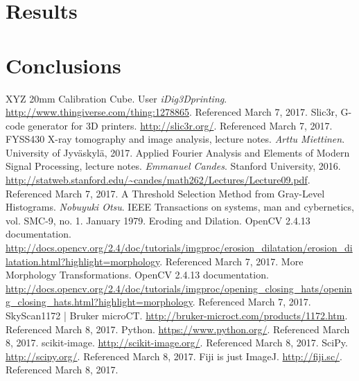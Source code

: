 \documentclass[a4paper,twoside,12pt]{article}
\begin{document}
\section{Results}

\section{Conclusions}

\clearpage

\begin{thebibliography}{9}
     XYZ 20mm Calibration Cube. User \emph{iDig3Dprinting}. \url{http://www.thingiverse.com/thing:1278865}. Referenced March 7, 2017.
     Slic3r, G-code generator for 3D printers. \url{http://slic3r.org/}. Referenced March 7, 2017.
     FYSS430 X-ray tomography and image analysis, lecture notes. \emph{Arttu Miettinen}. University of Jyväskylä, 2017.
     Applied Fourier Analysis and Elements of Modern Signal Processing, lecture notes. \emph{Emmanuel Candes}. Stanford University, 2016. \url{http://statweb.stanford.edu/~candes/math262/Lectures/Lecture09.pdf}. Referenced March 7, 2017.
     A Threshold Selection Method from Gray-Level Histograms. \emph{Nobuyuki Otsu}. IEEE Transactions on systems, man and cybernetics, vol. SMC-9, no. 1. January 1979.
     Eroding and Dilation. OpenCV 2.4.13 documentation. \url{http://docs.opencv.org/2.4/doc/tutorials/imgproc/erosion_dilatation/erosion_dilatation.html?highlight=morphology}. Referenced March 7, 2017.
     More Morphology Transformations. OpenCV 2.4.13 documentation. \url{http://docs.opencv.org/2.4/doc/tutorials/imgproc/opening_closing_hats/opening_closing_hats.html?highlight=morphology}. Referenced March 7, 2017.
     SkyScan1172 | Bruker microCT. \url{http://bruker-microct.com/products/1172.htm}. Referenced March 8, 2017.
     Python. \url{https://www.python.org/}. Referenced March 8, 2017.
     scikit-image. \url{http://scikit-image.org/}. Referenced March 8, 2017.
     SciPy. \url{http://scipy.org/}. Referenced March 8, 2017.
     Fiji is just ImageJ. \url{http://fiji.sc/}. Referenced March 8, 2017.
\end{thebibliography}
\end{document}
